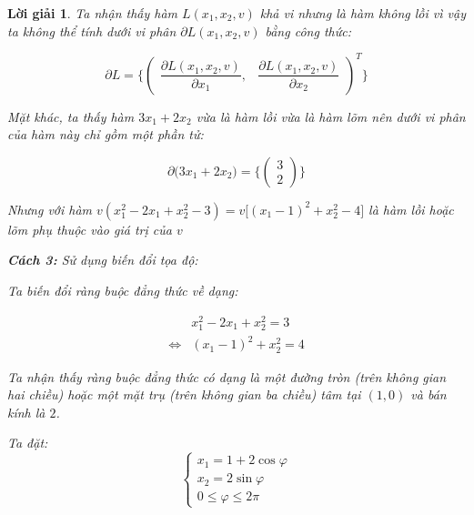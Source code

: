 \documentclass[14pt, a4paper]{article}
\theoremstyle{sltheorem}
\theoremstyle{soltheorem}
\newtheorem*{loigiai}{Lời giải}
\begin{document}
\begin{loigiai}
        Ta nhận thấy hàm $L(x_1, x_2, v)$ khả vi nhưng là hàm không lồi vì vậy ta không thể tính dưới vi phân $\partial L(x_1, x_2, v)$ bằng công thức:

        \begin{equation*}
            \partial L = \Bigg\lbrace \begin{pmatrix} \dfrac{\partial L(x_1, x_2, v)}{\partial x_1}, & \dfrac{\partial L(x_1, x_2, v)}{\partial x_2} \end{pmatrix}^T \Bigg\rbrace
        \end{equation*}

        Mặt khác, ta thấy hàm $3x_1 + 2x_2$ vừa là hàm lồi vừa là hàm lõm nên dưới vi phân của hàm này chỉ gồm một phần tử:

        \begin{equation*}
            \partial \Big( 3x_1 + 2 x_2 \Big) = \Big\lbrace \begin{pmatrix}
                3 \\ 2
            \end{pmatrix} \Big\rbrace
        \end{equation*}

        Nhưng với hàm $v(x_1^2 - 2x_1 + x_2^2 - 3)=v \Big \lbrack (x_1 - 1)^2 + x_2^2 - 4 \Big \rbrack$ là hàm lồi hoặc lõm phụ thuộc vào giá trị của $v$


        \textbf{Cách 3:} Sử dụng biến đổi tọa độ:

        Ta biến đổi ràng buộc đẳng thức về dạng:

        \begin{equation*}
            \begin{aligned}
            &x_1^2 - 2x_1 + x_2^2 = 3 \\
            \Leftrightarrow & (x_1 - 1)^2 + x_2^2 = 4
            \end{aligned}
        \end{equation*}

        Ta nhận thấy ràng buộc đẳng thức có dạng là một đường tròn (trên không gian hai chiều) hoặc một mặt trụ (trên không gian ba chiều) tâm tại $(1, 0)$ và bán kính là $2$.

        Ta đặt:
        \begin{equation*}
            \begin{cases}
                x_1 = 1 + 2 \cos \varphi \\
                x_2 = 2 \sin \varphi \\
                0 \leq \varphi \leq 2 \pi
            \end{cases}
        \end{equation*}


\end{loigiai}
\end{document}
